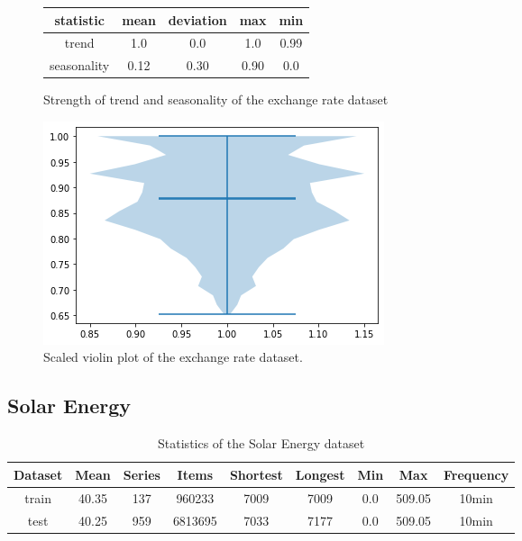 \begin{figure}[htb]
    \centering
        \begin{center}
            \begin{tabular}{||c | c | c | c | c |} 
                \hline
                statistic & mean & deviation & max & min\\
                \hline
                trend & 1.0 & 0.0 & 1.0 & 0.99 \\
                \hline
                seasonality & 0.12 & 0.30 & 0.90 & 0.0 \\
                \hline
                \hline
            \end{tabular}
            \caption{Strength of trend and seasonality of the exchange rate dataset}
        \end{center}
    \endminipage\hfill
      \includegraphics[width=\linewidth]{4_designing/figures/exchange_rate_violin.png}
      \caption{Scaled violin plot of the exchange rate dataset.}
      \label{fig:exchange_rate_violin}
    \endminipage\hfill
\end{figure}

\clearpage
\subsection{Solar Energy}


\begin{table}[htb]
    \begin{tabular}{||c | c c c c c c c c ||} 
        \hline
       Dataset & Mean & Series & Items & Shortest & Longest & Min & Max & Frequency\\ [0.5ex] 
        \hline\hline
        train & 40.35 & 137 & 960233 & 7009 & 7009 & 0.0 & 509.05 & 10min\\ 
        \hline
        test & 40.25 & 959 & 6813695 & 7033 & 7177 & 0.0 & 509.05 & 10min\\
        \hline
    \end{tabular}
    \caption{Statistics of the Solar Energy dataset}
\end{table}


